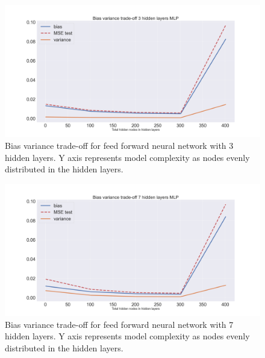 \documentclass[onecolumn,10pt,cleanfoot]{asme2ej}
\begin{document}
\begin{figure}[H]
\centerline{\includegraphics[width=5in]{figs/BV_ffnn3.png}}
\caption{Bias variance trade-off for feed forward neural network with 3 hidden layers. Y axis represents model complexity as nodes evenly distributed in the hidden layers.}
\label{ffnn5}
\end{figure}

\begin{figure}[H]
\centerline{\includegraphics[width=5in]{figs/BV_ffnn7.png}}
\caption{Bias variance trade-off for feed forward neural network with 7 hidden layers. Y axis represents model complexity as nodes evenly distributed in the hidden layers.}
\label{ffnn5}
\end{figure}
\end{document}
